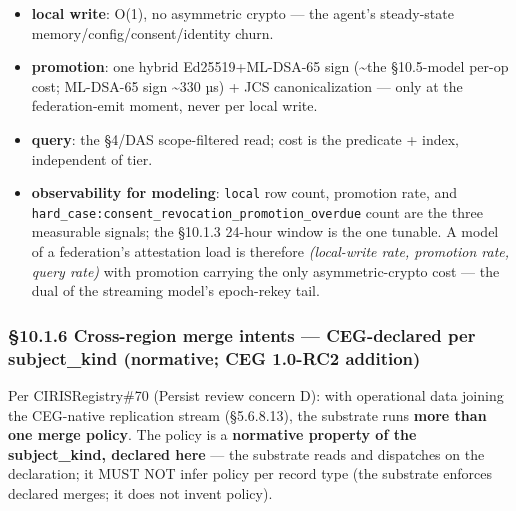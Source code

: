 \documentclass[11pt]{article}
\begin{document}
\begin{itemize}\setlength\itemsep{0pt}
\item \textbf{local write}: O(1), no asymmetric crypto — the agent's steady-state memory/config/consent/identity churn.
\item \textbf{promotion}: one hybrid Ed25519+ML-DSA-65 sign (\textasciitilde{}the §10.5-model per-op cost; ML-DSA-65 sign \textasciitilde{}330 µs) + JCS canonicalization — only at the federation-emit moment, never per local write.
\item \textbf{query}: the §4/DAS scope-filtered read; cost is the predicate + index, independent of tier.
\item \textbf{observability for modeling}: \texttt{local} row count, promotion rate, and \texttt{hard\_case:consent\_revocation\_promotion\_overdue} count are the three measurable signals; the §10.1.3 24-hour window is the one tunable. A model of a federation's attestation load is therefore \textit{(local-write rate, promotion rate, query rate)} with promotion carrying the only asymmetric-crypto cost — the dual of the streaming model's epoch-rekey tail.
\end{itemize}


\subsubsection*{§10.1.6 Cross-region merge intents — CEG-declared per subject\_kind (normative; CEG 1.0-RC2 addition)}


Per CIRISRegistry\#70 (Persist review concern D): with operational data joining the CEG-native replication stream (§5.6.8.13), the substrate runs \textbf{more than one merge policy}. The policy is a \textbf{normative property of the subject\_kind, declared here} — the substrate reads and dispatches on the declaration; it MUST NOT infer policy per record type (the substrate enforces declared merges; it does not invent policy).
\end{document}
